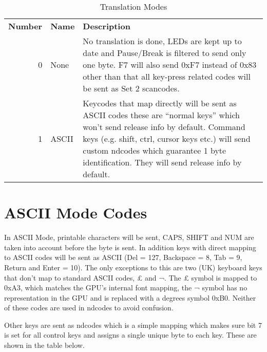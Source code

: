\begin{table}
 \begin{tabular}{rlp{7cm}}
  \textbf{Number}&\textbf{Name}&\textbf{Description}\\
  0&None&No translation is done, LEDs are kept up to date and Pause/Break is
         filtered to send only one byte.  F7 will also send 0xF7 instead of 0x83
         other than that all key-press related codes will be sent as Set 2
         scancodes.\\
  1&ASCII&Keycodes that map directly will be sent as ASCII codes these are
          ``normal keys'' which won't send release info by default.  Command
          keys (e.g. shift, ctrl, cursor keys etc.) will send custom ndcodes
          which guarantee 1 byte identification.  They will send release info
          by default.\\
 \end{tabular}
 \caption{Translation Modes}
 \label{tab:translators}
\end{table}

\section{ASCII Mode Codes}
In ASCII Mode, printable characters will be sent, CAPS, SHIFT and NUM are taken
into account before the byte is sent.  In addition keys with direct mapping to
ASCII codes will be sent as ASCII (Del = 127, Backspace = 8, Tab = 9, Return and
Enter = 10).  The only exceptions to this are two (UK) keyboard keys that don't
map to standard ASCII codes, £ and ¬.  The £ symbol is mapped to 0xA3, which 
matches the GPU's internal font mapping, the ¬ symbol has no representation in
the GPU and is replaced with a degrees symbol 0xB0.  Neither of these codes are
used in ndcodes to avoid confusion.

Other keys are sent as ndcodes which is a simple mapping which makes sure bit 7
is set for all control keys and assigns a single unique byte to each key.  These
are shown in the table below.

